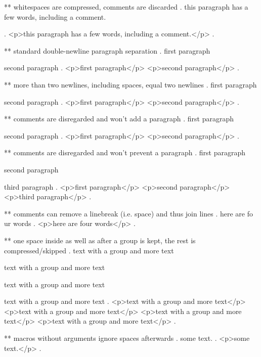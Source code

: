 ** whitespaces are compressed, comments are discarded
.
   this     paragraph  has a    few 
 words,   including
 a comment.


 
.
<p>this paragraph has a few words, including a comment.</p>
.


** standard double-newline paragraph separation
.
first paragraph

second paragraph
.
<p>ﬁrst paragraph</p>
<p>second paragraph</p>
.



** more than two newlines, including spaces, equal two newlines
.
first paragraph

   
  


second paragraph
.
<p>ﬁrst paragraph</p>
<p>second paragraph</p>
.


** comments are disregarded and won't add a paragraph
.
first paragraph




second paragraph
.
<p>ﬁrst paragraph</p>
<p>second paragraph</p>
.

** comments are disregarded and won't prevent a paragraph
.
first paragraph %

second paragraph%

third paragraph
.
<p>ﬁrst paragraph</p>
<p>second paragraph</p>
<p>third paragraph</p>
.


** comments can remove a linebreak (i.e. space) and thus join lines
.
here are fo%
ur words
.
<p>here are four words</p>
.


** one space inside as well as after a group is kept, the rest is compressed/skipped
.
text with {a group} and more text

text with { a group } and more text

text with { a group  } and more text

text with {  a group  }  and more text
.
<p>text with a group and more text</p>
<p>text with  a group  and more text</p>
<p>text with  a group  and more text</p>
<p>text with  a group  and more text</p>
.

** macros without arguments ignore spaces afterwards
.
some \echo  text.
.
<p>some text.</p>
.

